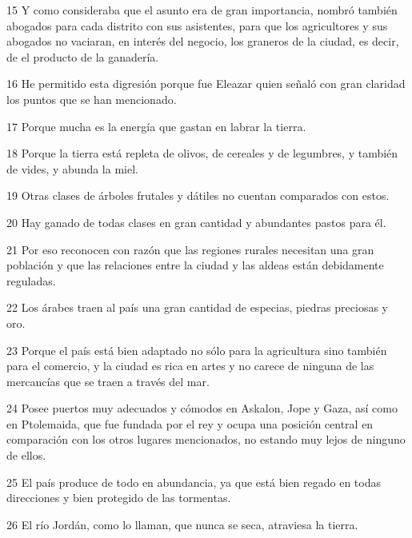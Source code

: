 \par 15 Y como consideraba que el asunto era de gran importancia, nombró también abogados para cada distrito con sus asistentes, para que los agricultores y sus abogados no vaciaran, en interés del negocio, los graneros de la ciudad, es decir, de el producto de la ganadería.

\par 16 He permitido esta digresión porque fue Eleazar quien señaló con gran claridad los puntos que se han mencionado.

\par 17 Porque mucha es la energía que gastan en labrar la tierra.

\par 18 Porque la tierra está repleta de olivos, de cereales y de legumbres, y también de vides, y abunda la miel.

\par 19 Otras clases de árboles frutales y dátiles no cuentan comparados con estos.

\par 20 Hay ganado de todas clases en gran cantidad y abundantes pastos para él.

\par 21 Por eso reconocen con razón que las regiones rurales necesitan una gran población y que las relaciones entre la ciudad y las aldeas están debidamente reguladas.

\par 22 Los árabes traen al país una gran cantidad de especias, piedras preciosas y oro.

\par 23 Porque el país está bien adaptado no sólo para la agricultura sino también para el comercio, y la ciudad es rica en artes y no carece de ninguna de las mercancías que se traen a través del mar.

\par 24 Posee puertos muy adecuados y cómodos en Askalon, Jope y Gaza, así como en Ptolemaida, que fue fundada por el rey y ocupa una posición central en comparación con los otros lugares mencionados, no estando muy lejos de ninguno de ellos.

\par 25 El país produce de todo en abundancia, ya que está bien regado en todas direcciones y bien protegido de las tormentas.

\par 26 El río Jordán, como lo llaman, que nunca se seca, atraviesa la tierra.

